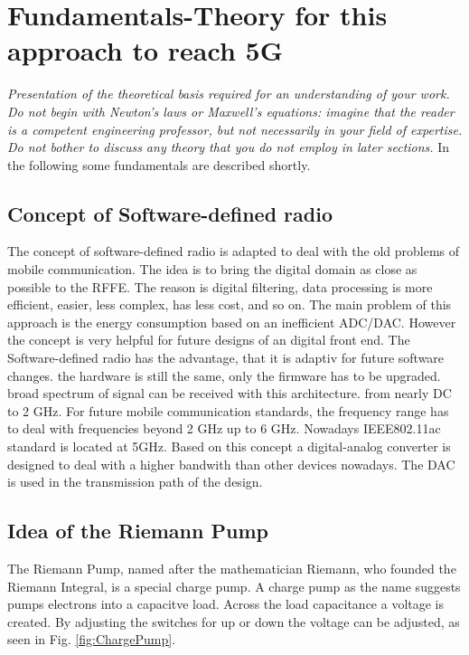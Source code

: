 \chapter{Fundamentals-Theory for this approach to reach 5G}
\label{ch:fundamentals}
\textit{Presentation of the theoretical basis required for an understanding of your work. Do not begin with Newton's laws or Maxwell's equations: imagine that the reader is a competent engineering professor, but not necessarily in your field of expertise. Do not bother to discuss any theory that you do not employ in later sections.}
In the following some fundamentals are described shortly.
\section{Concept of Software-defined radio}
The concept of software-defined radio is adapted to deal with the old problems of mobile communication. The idea is to bring the digital domain as close as possible to the RFFE. The reason is digital filtering, data processing is more efficient, easier, less complex, has less cost, and so on. The main problem of this approach is the energy consumption based on an inefficient ADC/DAC. However the concept is very helpful for future designs of an digital front end. The Software-defined radio has the advantage, that it is adaptiv for future software changes. the hardware is still the same, only the firmware has to be upgraded. broad spectrum of signal can be received with this architecture. from nearly DC to 2 GHz. For future mobile communication standards, the frequency range has to deal with frequencies beyond 2 GHz up to 6 GHz. Nowadays IEEE802.11ac standard is located at 5GHz. Based on this concept a digital-analog converter is designed to deal with a higher bandwith than other devices nowadays. The DAC is used in the transmission path of the design.
\section{Idea of the Riemann Pump}
The Riemann Pump, named after the mathematician Riemann, who founded the Riemann Integral, is a special charge pump. A charge pump as the name suggests pumps electrons into a capacitve load. Across the load capacitance a voltage is created. By adjusting the switches for up or down the voltage can be adjusted, as seen in Fig. \ref{fig:ChargePump}. 

